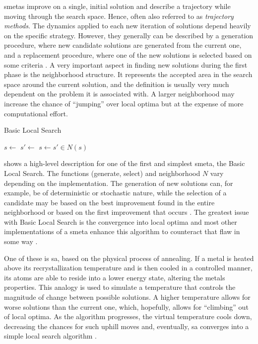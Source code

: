 \Glspl{smeta} improve on a single, initial solution and describe a trajectory while moving through the search space. Hence, often also referred to as \textit{trajectory methods}. The dynamics applied to each new iteration of solutions depend heavily on the specific strategy. However, they generally can be described by a generation procedure, where new candidate solutions are generated from the current one, and a replacement procedure, where one of the new solutions is selected based on some criteria \cite{talbi2009metaheuristics}. A very important aspect in finding new solutions during the first phase is the neighborhood structure. It represents the accepted area in the search space around the current solution, and the definition is usually very much dependent on the problem it is associated with. A larger neighborhood may increase the chance of \enquote{jumping} over local optima but at the expense of more computational effort.
\begin{algorithm}
	\caption{Basic Local Search}
	\label{alg:basiclocalsearch}
	
	\begin{algorithmic}
		
		\State $s \gets $ 
		\Repeat
		\State $ s'  \gets $ 
		\State $ s \gets s' \in N(s)$
		\EndIf
	\end{algorithmic}
\end{algorithm}

  shows a high-level description for one of the first and simplest \gls{smeta}, the Basic Local Search. The functions (generate, select) and neighborhood $N$ vary depending on the implementation. The generation of new solutions can, for example, be of deterministic or stochastic nature, while the selection of a candidate may be based on the best improvement found in the entire neighborhood or based on the first improvement that occurs \cite{talbi2009metaheuristics}. The greatest issue with Basic Local Search is the convergence into local optima and most other implementations of a \gls{smeta} enhance this algorithm to counteract that flaw in some way \cite{blum2003metaheuristics}. 
 
 One of these is \gls{sa}, based on the physical process of annealing. If a metal is heated above its recrystallization temperature and is then cooled in a controlled manner, its atoms are able to reside into a lower energy state, altering the metals properties. This analogy is used to simulate a temperature that controls the magnitude of change between possible solutions. A higher temperature allows for worse solutions than the current one, which, hopefully, allows for \enquote{climbing} out of local optima. As the algorithm progresses, the virtual temperature cools down, decreasing the chances for such uphill moves and, eventually, \gls{sa} converges into a simple local search algorithm \cite{blum2003metaheuristics}.
 
